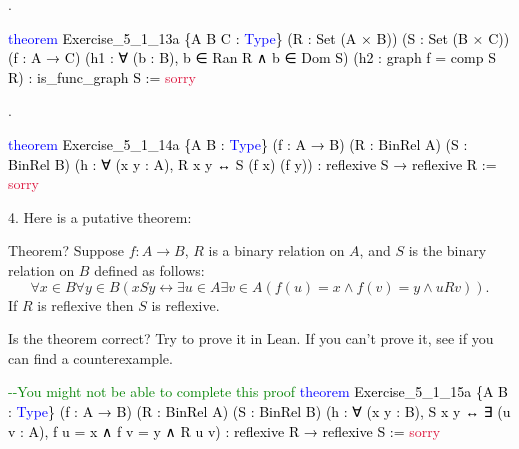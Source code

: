 \documentclass[
  letterpaper,
  DIV=11,
  numbers=noendperiod]{scrreprt}
\newenvironment{Shaded}{\begin{snugshade}}{\end{snugshade}}
\newcommand{\CommentTok}[1]{\textcolor[rgb]{0.37,0.37,0.37}{#1}}
\newcommand{\ConstantTok}[1]{\textcolor[rgb]{0.56,0.35,0.01}{#1}}
\newcommand{\KeywordTok}[1]{\textcolor[rgb]{0.00,0.23,0.31}{#1}}
\newcommand{\NormalTok}[1]{\textcolor[rgb]{0.00,0.23,0.31}{#1}}
\renewcommand{\NormalTok}[1]{\textcolor[HTML]{000000}{#1}}
\renewcommand{\KeywordTok}[1]{\textcolor[HTML]{0000FF}{#1}}
\renewcommand{\CommentTok}[1]{\textcolor[HTML]{008000}{#1}}
\renewcommand{\ConstantTok}[1]{\textcolor[HTML]{DC143C}{#1}}
\newcommand{\nobreakShaded}{\renewenvironment{Shaded}
	{\begin{tcolorbox}[frame hidden, enhanced, interior hidden, boxrule=0pt,
		borderline west={3pt}{0pt}{shadecolor}, sharp corners]}
	{\end{tcolorbox}}}
\newenvironment{numex}[1]
	{\begin{minipage}[t]{0.04\textwidth}\vspace{8pt}{#1}.
		\end{minipage}\nobreakShaded\begin{minipage}[t]{0.96\textwidth}\vspace{0pt}}
	{\end{minipage}}
\theoremstyle{remark}
\begin{document}
\begin{numex}{2}

\begin{Shaded}
\begin{Highlighting}[]
\KeywordTok{theorem}\NormalTok{ Exercise\_5\_1\_13a}
\NormalTok{    \{A B C : }\KeywordTok{Type}\NormalTok{\} (R : Set (A × B)) (S : Set (B × C)) (f : A → C)}
\NormalTok{    (h1 : ∀ (b : B), b ∈ Ran R ∧ b ∈ Dom S) (h2 : graph f = comp S R) :}
\NormalTok{    is\_func\_graph S := }\ConstantTok{sorry}
\end{Highlighting}
\end{Shaded}

\end{numex}

\begin{numex}{3}

\begin{Shaded}
\begin{Highlighting}[]
\KeywordTok{theorem}\NormalTok{ Exercise\_5\_1\_14a}
\NormalTok{    \{A B : }\KeywordTok{Type}\NormalTok{\} (f : A → B) (R : BinRel A) (S : BinRel B)}
\NormalTok{    (h : ∀ (x y : A), R x y ↔ S (f x) (f y)) :}
\NormalTok{    reflexive S → reflexive R := }\ConstantTok{sorry}
\end{Highlighting}
\end{Shaded}

\end{numex}

4. Here is a putative theorem:

\begin{nthm}{Theorem?}
Suppose \(f : A \to B\), \(R\) is a binary relation on \(A\), and \(S\)
is the binary relation on \(B\) defined as follows: \[
\forall x \in B \forall y \in B(xSy \leftrightarrow \exists u \in A\exists v \in A(f(u) = x \wedge f(v) = y \wedge uRv)).
\] If \(R\) is reflexive then \(S\) is reflexive.

\end{nthm}

Is the theorem correct? Try to prove it in Lean. If you can't prove it,
see if you can find a counterexample.

\begin{Shaded}
\begin{Highlighting}[]
\CommentTok{{-}{-}You might not be able to complete this proof}
\KeywordTok{theorem}\NormalTok{ Exercise\_5\_1\_15a}
\NormalTok{    \{A B : }\KeywordTok{Type}\NormalTok{\} (f : A → B) (R : BinRel A) (S : BinRel B)}
\NormalTok{    (h : ∀ (x y : B), S x y ↔ ∃ (u v : A), f u = x ∧ f v = y ∧ R u v) :}
\NormalTok{    reflexive R → reflexive S := }\ConstantTok{sorry}
\end{Highlighting}
\end{Shaded}
\end{document}
